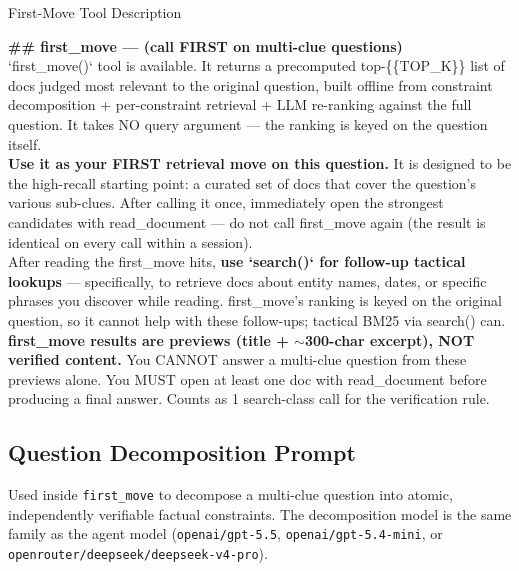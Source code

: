 \begin{promptbox}{First-Move Tool Description}
\ttfamily\footnotesize\raggedright
\textbf{\#\# first\_move --- (call FIRST on multi-clue questions)}
\\[4pt]
`first\_move()` tool is available. It returns a precomputed top-\{\{TOP\_K\}\} list of docs judged most relevant to the original question, built offline from constraint decomposition + per-constraint retrieval + LLM re-ranking against the full question. It takes NO query argument --- the ranking is keyed on the question itself.
\\[4pt]
\textbf{Use it as your FIRST retrieval move on this question.} It is designed to be the high-recall starting point: a curated set of docs that cover the question's various sub-clues. After calling it once, immediately open the strongest candidates with read\_document --- do not call first\_move again (the result is identical on every call within a session).
\\[4pt]
After reading the first\_move hits, \textbf{use `search()` for follow-up tactical lookups} --- specifically, to retrieve docs about entity names, dates, or specific phrases you discover while reading. first\_move's ranking is keyed on the original question, so it cannot help with these follow-ups; tactical BM25 via search() can.
\\[4pt]
\textbf{first\_move results are previews (title + $\sim$300-char excerpt), NOT verified content.} You CANNOT answer a multi-clue question from these previews alone. You MUST open at least one doc with read\_document before producing a final answer. Counts as 1 search-class call for the verification rule.
\end{promptbox}


\subsection{Question Decomposition Prompt}
\label{prompt:decomp}

Used inside {\tt first\_move} to decompose a multi-clue question
into atomic, independently verifiable factual constraints.  The
decomposition model is the same family as the agent model
({\tt openai/gpt-5.5}, {\tt openai/gpt-5.4-mini}, or
{\tt openrouter/deepseek/deepseek-v4-pro}).

